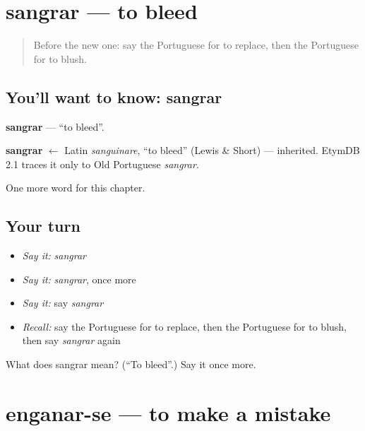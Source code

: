 \section[sangrar]{sangrar — to bleed}

\label{lesson:PT-C147-sangrar}



\begin{quote}
Before the new one: say the Portuguese for to replace, then the Portuguese for to blush.
\end{quote}

\subsection*{You'll want to know: sangrar}
\textbf{sangrar} — \textquotedblleft{}to bleed\textquotedblright{}.

\begin{cousinweb}
\textbf{sangrar} $\leftarrow$ Latin \emph{sanguinare}, \textquotedblleft{}to bleed\textquotedblright{} (Lewis \& Short) — inherited. EtymDB 2.1 traces it only to Old Portuguese \emph{sangrar}.
\end{cousinweb}

\begin{grammarlens}[title={What you've built}]
One more word for this chapter.
\end{grammarlens}

\subsection*{Your turn}
\begin{itemize}
\raggedright
  \item \emph{Say it:} \emph{sangrar}
  \item \emph{Say it:} \emph{sangrar}, once more
  \item \emph{Say it:} say \emph{sangrar}
  \item \emph{Recall:} say the Portuguese for to replace, then the Portuguese for to blush, then say \emph{sangrar} again
\end{itemize}

\begin{tcolorbox}[breakable,colback=teal!4,colframe=teal!35!black,title={Before you move on}]
What does sangrar mean? (\textquotedblleft{}To bleed\textquotedblright{}.) Say it once more.
\end{tcolorbox}
\section[enganar-se]{enganar-se — to make a mistake}

